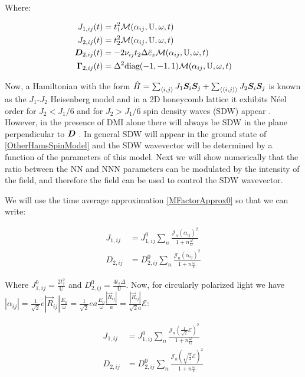 Where:

\begin{align*}
J_{1,ij}(t) &= t_1^2\mathcal{M}(\alpha_{ij}, \text{U}, \omega, t) \\
J_{2,ij}(t) &= t_2^2\mathcal{M}(\alpha_{ij}, \text{U}, \omega, t) \\
\boldsymbol{D}_{2,ij}(t) &= - 2\nu_{ij} t_2 \Delta \hat{e}_z \mathcal{M}(\alpha_{ij}, \text{U}, \omega, t) \\
\boldsymbol{\Gamma}_{2,ij}(t) &= \Delta^2 \text{diag}(-1,-1,1) \mathcal{M}(\alpha_{ij}, \text{U}, \omega, t) 
\end{align*}

Now, a Hamiltonian with the form $\hat{H} = \sum_{\langle i,j \rangle} J_1 \boldsymbol{S}_i\boldsymbol{S}_j + \sum_{\langle \langle i,j \rangle \rangle} J_2\boldsymbol{S}_i\boldsymbol{S}_j$ is known as the $J_1$-$J_2$ Heisenberg model and in a 2D honeycomb lattice it exhibits N\'eel order for $J_2 < J_1 / 6$ and for $J_2 > J_1 / 6$ spin density waves (SDW) appear \cite{Mulder2010}. However, in the presence of DMI alone there will always be SDW in the plane perpendicular to $\boldsymbol{D}$ \cite{Uchida2006}. In general SDW will appear in the ground state of \ref{OtherHamsSpinModel} and the SDW wavevector will be determined by a function of the parameters of this model. Next we will show numerically that the ratio between the NN and NNN parameters can be modulated by the intensity of the field, and therefore the field can be used to control the SDW wavevector. 

We will use the time average approximation \ref{MFactorApprox0} so that we can write:

\begin{align}
J_{1,ij} &= J_{1,ij}^0  \sum_{n} \frac{\mathcal{J}_n(\alpha_{ij})^2}{1+n\frac{\omega}{\text{U}}} \\
D_{2,ij} &= D_{2,ij}^0  \sum_{n} \frac{\mathcal{J}_n(\alpha_{ij})^2}{1+n\frac{\omega}{\text{U}}}
\end{align}

Where $J_{1,ij}^0 = \frac{2t_1^2}{\text{U}}$ and $D_{2,ij}^0 = \frac{4t_2\Delta}{\text{U}}$. Now, for circularly polarized light we have $|\alpha_{ij}| = \frac{1}{\sqrt{2}}e|\vec{R}_{ij}| \frac{E_0}{\omega} = \frac{1}{\sqrt{2}}ea \frac{E_0}{\omega} \frac{|\vec{R}_{ij}|}{a} = \frac{|\vec{R}_{ij}|}{\sqrt{2}a} \mathcal{E}$:

\begin{align}
J_{1,ij} &= J_{1,ij}^0  \sum_{n} \frac{\mathcal{J}_n(\frac{1}{\sqrt{2}}\mathcal{E})^2}{1+n\frac{\omega}{\text{U}}} \\
D_{2,ij} &= D_{2,ij}^0  \sum_{n} \frac{\mathcal{J}_n(\sqrt{\frac{3}{2}}\mathcal{E})^2}{1+n\frac{\omega}{\text{U}}}
\end{align}

